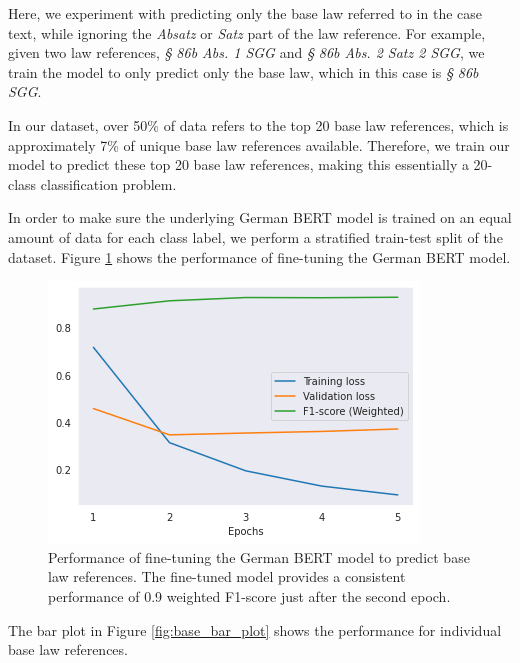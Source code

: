 \documentclass[sigconf]{acmart}
\begin{document}
Here, we experiment with predicting only the base law referred to in the case text, while ignoring the \textit{Absatz} or \textit{Satz} part of the law reference. For example, given two law references, \textit{§ 86b Abs. 1 SGG} and \textit{§ 86b Abs. 2 Satz 2 SGG}, we train the model to only predict only the base law, which in this case is \textit{§ 86b SGG}.

In our dataset, over 50\% of data refers to the top 20 base law references, which is approximately 7\% of unique base law references available. Therefore, we train our model to predict these top 20 base law references, making this essentially a 20-class classification problem.

In order to make sure the underlying German BERT model is trained on an equal amount of data for each class label, we perform a stratified train-test split of the dataset. Figure \ref{fig:base_plot} shows the performance of fine-tuning the German BERT model.

\begin{figure}[h]
	\centering
	\includegraphics[width=0.9\linewidth]{latex/plot.png}
	\caption{Performance of fine-tuning the German BERT model to predict base law references. The fine-tuned model provides a consistent performance of 0.9 weighted F1-score just after the second epoch.}
	\label{fig:base_plot}
\end{figure}

The bar plot in Figure \ref{fig:base_bar_plot} shows the performance for individual base law references.
\end{document}
